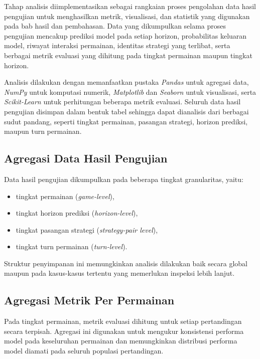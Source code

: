 Tahap analisis diimplementasikan sebagai rangkaian proses pengolahan data hasil pengujian untuk menghasilkan metrik, visualisasi, dan statistik yang digunakan pada bab hasil dan pembahasan. Data yang dikumpulkan selama proses pengujian mencakup prediksi model pada setiap horizon, probabilitas keluaran model, riwayat interaksi permainan, identitas strategi yang terlibat, serta berbagai metrik evaluasi yang dihitung pada tingkat permainan maupun tingkat horizon.

Analisis dilakukan dengan memanfaatkan pustaka \textit{Pandas} untuk agregasi data, \textit{NumPy} untuk komputasi numerik, \textit{Matplotlib} dan \textit{Seaborn} untuk visualisasi, serta \textit{Scikit-Learn} untuk perhitungan beberapa metrik evaluasi. Seluruh data hasil pengujian disimpan dalam bentuk tabel sehingga dapat dianalisis dari berbagai sudut pandang, seperti tingkat permainan, pasangan strategi, horizon prediksi, maupun turn permainan.

\subsection{Agregasi Data Hasil Pengujian}

Data hasil pengujian dikumpulkan pada beberapa tingkat granularitas, yaitu:

\begin{itemize}
\item tingkat permainan (\textit{game-level}),
\item tingkat horizon prediksi (\textit{horizon-level}),
\item tingkat pasangan strategi (\textit{strategy-pair level}),
\item tingkat turn permainan (\textit{turn-level}).
\end{itemize}

Struktur penyimpanan ini memungkinkan analisis dilakukan baik secara global maupun pada kasus-kasus tertentu yang memerlukan inspeksi lebih lanjut.

\subsection{Agregasi Metrik Per Permainan}

Pada tingkat permainan, metrik evaluasi dihitung untuk setiap pertandingan secara terpisah. Agregasi ini digunakan untuk mengukur konsistensi performa model pada keseluruhan permainan dan memungkinkan distribusi performa model diamati pada seluruh populasi pertandingan.

